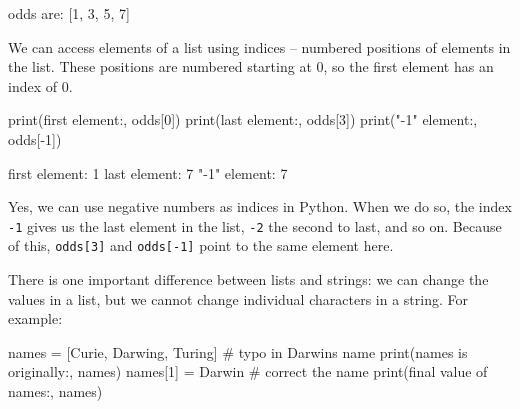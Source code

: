 \documentclass[
  letterpaper,
  DIV=11,
  numbers=noendperiod]{scrartcl}
\newenvironment{Shaded}{\begin{snugshade}}{\end{snugshade}}
\newcommand{\BuiltInTok}[1]{\textcolor[rgb]{0.00,0.23,0.31}{#1}}
\newcommand{\CommentTok}[1]{\textcolor[rgb]{0.37,0.37,0.37}{#1}}
\newcommand{\DecValTok}[1]{\textcolor[rgb]{0.68,0.00,0.00}{#1}}
\newcommand{\NormalTok}[1]{\textcolor[rgb]{0.00,0.23,0.31}{#1}}
\newcommand{\OperatorTok}[1]{\textcolor[rgb]{0.37,0.37,0.37}{#1}}
\newcommand{\StringTok}[1]{\textcolor[rgb]{0.13,0.47,0.30}{#1}}
\theoremstyle{remark}
\begin{document}
\begin{Shaded}
\begin{Highlighting}[]
\NormalTok{odds are: [1, 3, 5, 7]}
\end{Highlighting}
\end{Shaded}

We can access elements of a list using indices -- numbered positions of
elements in the list. These positions are numbered starting at 0, so the
first element has an index of 0.

\begin{Shaded}
\begin{Highlighting}[]
\BuiltInTok{print}\NormalTok{(}\StringTok{\textquotesingle{}first element:\textquotesingle{}}\NormalTok{, odds[}\DecValTok{0}\NormalTok{])}
\BuiltInTok{print}\NormalTok{(}\StringTok{\textquotesingle{}last element:\textquotesingle{}}\NormalTok{, odds[}\DecValTok{3}\NormalTok{])}
\BuiltInTok{print}\NormalTok{(}\StringTok{\textquotesingle{}"{-}1" element:\textquotesingle{}}\NormalTok{, odds[}\OperatorTok{{-}}\DecValTok{1}\NormalTok{])}
\end{Highlighting}
\end{Shaded}

\begin{Shaded}
\begin{Highlighting}[]
\NormalTok{first element: 1}
\NormalTok{last element: 7}
\NormalTok{"{-}1" element: 7}
\end{Highlighting}
\end{Shaded}

Yes, we can use negative numbers as indices in Python. When we do so,
the index \texttt{-1} gives us the last element in the list, \texttt{-2}
the second to last, and so on. Because of this, \texttt{odds{[}3{]}} and
\texttt{odds{[}-1{]}} point to the same element here.

There is one important difference between lists and strings: we can
change the values in a list, but we cannot change individual characters
in a string. For example:

\begin{Shaded}
\begin{Highlighting}[]
\NormalTok{names }\OperatorTok{=}\NormalTok{ [}\StringTok{\textquotesingle{}Curie\textquotesingle{}}\NormalTok{, }\StringTok{\textquotesingle{}Darwing\textquotesingle{}}\NormalTok{, }\StringTok{\textquotesingle{}Turing\textquotesingle{}}\NormalTok{]  }\CommentTok{\# typo in Darwin\textquotesingle{}s name}
\BuiltInTok{print}\NormalTok{(}\StringTok{\textquotesingle{}names is originally:\textquotesingle{}}\NormalTok{, names)}
\NormalTok{names[}\DecValTok{1}\NormalTok{] }\OperatorTok{=} \StringTok{\textquotesingle{}Darwin\textquotesingle{}}  \CommentTok{\# correct the name}
\BuiltInTok{print}\NormalTok{(}\StringTok{\textquotesingle{}final value of names:\textquotesingle{}}\NormalTok{, names)}
\end{Highlighting}
\end{Shaded}
\end{document}
